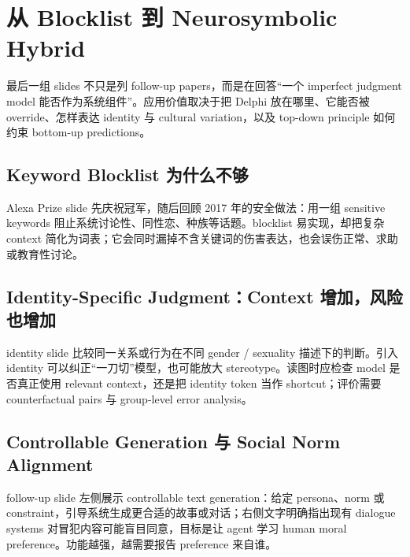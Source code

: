 \section{从 Blocklist 到 Neurosymbolic Hybrid}

最后一组 slides 不只是列 follow-up papers，而是在回答“一个 imperfect judgment model 能否作为系统组件”。应用价值取决于把 Delphi 放在哪里、它能否被 override、怎样表达 identity 与 cultural variation，以及 top-down principle 如何约束 bottom-up predictions。

\subsection{Keyword Blocklist 为什么不够}

Alexa Prize slide 先庆祝冠军，随后回顾 2017 年的安全做法：用一组 sensitive keywords 阻止系统讨论性、同性恋、种族等话题。blocklist 易实现，却把复杂 context 简化为词表；它会同时漏掉不含关键词的伤害表达，也会误伤正常、求助或教育性讨论。



\subsection{Identity-Specific Judgment：Context 增加，风险也增加}

identity slide 比较同一关系或行为在不同 gender / sexuality 描述下的判断。引入 identity 可以纠正“一刀切”模型，也可能放大 stereotype。读图时应检查 model 是否真正使用 relevant context，还是把 identity token 当作 shortcut；评价需要 counterfactual pairs 与 group-level error analysis。


\subsection{Controllable Generation 与 Social Norm Alignment}

follow-up slide 左侧展示 controllable text generation：给定 persona、norm 或 constraint，引导系统生成更合适的故事或对话；右侧文字明确指出现有 dialogue systems 对冒犯内容可能盲目同意，目标是让 agent 学习 human moral preference。功能越强，越需要报告 preference 来自谁。


